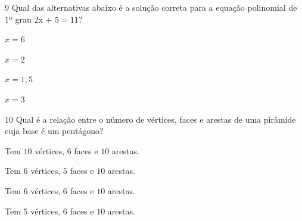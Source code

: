 
\num{9}  Qual das alternativas abaixo é a solução correta para a equação
polinomial de 1º grau $2$x + $5 = 11$?

\begin{escolha}
\item $x = 6$
\item $x = 2$
\item $x = 1,5$
\item $x = 3$
\end{escolha}



\num{10} Qual é a relação entre o número de vértices, faces e arestas de uma
pirâmide cuja base é um pentágono?

\begin{escolha}
\item Tem $10$ vértices, $6$ faces e $10$ arestas.
\item Tem $6$ vértices, $5$ faces e $10$ arestas.
\item Tem $6$ vértices, $6$ faces e $10$ arestas.
\item Tem $5$ vértices, $6$ faces e $10$ arestas.
\end{escolha}

